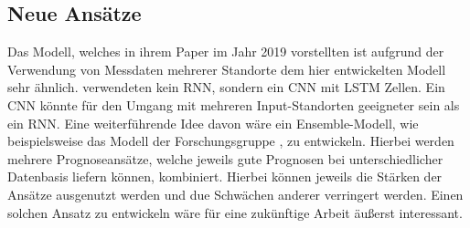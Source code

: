 \documentclass[
12pt, %
toc=listofnumbered, %
toc=chapterentrydotfill, %
numbers=noenddot, %
captions=tableheading, %
bibliography=numbered
]{scrreprt}
\let\Oldsection\section
\renewcommand{\section}{\FloatBarrier\Oldsection}
\let\Oldsubsection\subsection
\renewcommand{\subsection}{\FloatBarrier\Oldsubsection}
\begin{document}
\subsection{Neue Ansätze}
Das Modell, welches \citeauthor{2019_Chen_MultifactorSpatiotemporalCorrelation} in ihrem Paper im Jahr 2019 vorstellten \cite{2019_Chen_MultifactorSpatiotemporalCorrelation} ist aufgrund der Verwendung von Messdaten mehrerer Standorte dem hier entwickelten Modell sehr ähnlich. 
\citeauthor{2019_Chen_MultifactorSpatiotemporalCorrelation} verwendeten kein RNN, sondern ein CNN mit LSTM Zellen. Ein CNN könnte für den Umgang mit mehreren Input-Standorten geeigneter sein als ein RNN.
\newline
Eine weiterführende Idee davon wäre ein Ensemble-Modell, wie beispielsweise das Modell der Forschungsgruppe \citeauthor{2017_Zhang_HybridMethodShortTerm} \cite{2017_Zhang_HybridMethodShortTerm}, zu entwickeln. Hierbei werden mehrere Prognoseansätze, welche jeweils gute Prognosen bei unterschiedlicher Datenbasis liefern können, kombiniert. 
Hierbei können jeweils die Stärken der Ansätze ausgenutzt werden und due Schwächen anderer verringert werden. Einen solchen Ansatz zu entwickeln wäre für eine zukünftige Arbeit äußerst interessant.



\end{document}

